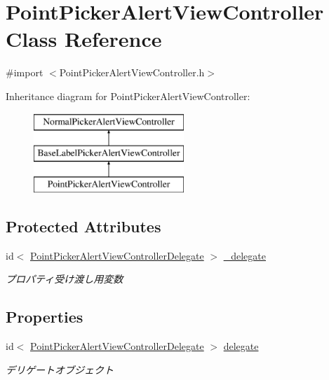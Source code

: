 \hypertarget{interface_point_picker_alert_view_controller}{
\section{PointPickerAlertViewController Class Reference}
\label{interface_point_picker_alert_view_controller}
}


{\ttfamily \#import $<$PointPickerAlertViewController.h$>$}

Inheritance diagram for PointPickerAlertViewController:\begin{figure}[H]
\begin{center}
\leavevmode
\includegraphics[height=3.000000cm]{interface_point_picker_alert_view_controller}
\end{center}
\end{figure}
\subsection*{Protected Attributes}
\begin{DoxyCompactItemize}
\item 
\hypertarget{interface_point_picker_alert_view_controller_acde7df8cdadcee9df04da93af06fd0da}{
id$<$ \hyperlink{protocol_point_picker_alert_view_controller_delegate-p}{PointPickerAlertViewControllerDelegate} $>$ \hyperlink{interface_point_picker_alert_view_controller_acde7df8cdadcee9df04da93af06fd0da}{\_\-delegate}}
\label{interface_point_picker_alert_view_controller_acde7df8cdadcee9df04da93af06fd0da}

\begin{DoxyCompactList}\small\item\em プロパティ受け渡し用変数 \end{DoxyCompactList}\end{DoxyCompactItemize}
\subsection*{Properties}
\begin{DoxyCompactItemize}
\item 
\hypertarget{interface_point_picker_alert_view_controller_a50e6a7d973d361bc3c0acbb2d54a529b}{
id$<$ \hyperlink{protocol_point_picker_alert_view_controller_delegate-p}{PointPickerAlertViewControllerDelegate} $>$ \hyperlink{interface_point_picker_alert_view_controller_a50e6a7d973d361bc3c0acbb2d54a529b}{delegate}}
\label{interface_point_picker_alert_view_controller_a50e6a7d973d361bc3c0acbb2d54a529b}

\begin{DoxyCompactList}\small\item\em デリゲートオブジェクト \end{DoxyCompactList}\end{DoxyCompactItemize}


